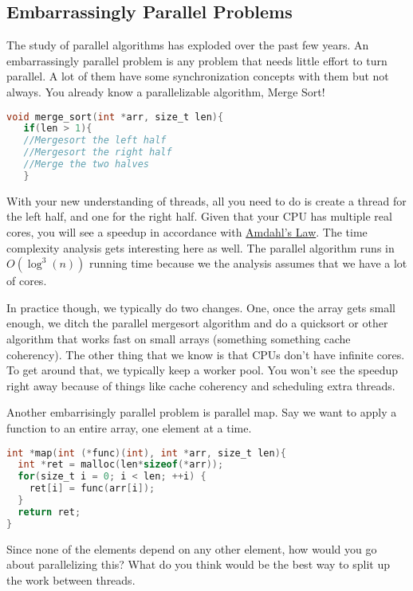 \subsection{Embarrassingly Parallel Problems}

The study of parallel algorithms has exploded over the past few years.
An embarrassingly parallel problem is any problem that needs little effort to turn parallel.
A lot of them have some synchronization concepts with them but not always.
You already know a parallelizable algorithm, Merge Sort!

\begin{lstlisting}[language=C]
void merge_sort(int *arr, size_t len){
   if(len > 1){
   //Mergesort the left half
   //Mergesort the right half
   //Merge the two halves
   }
\end{lstlisting}

With your new understanding of threads, all you need to do is create a thread for the left half, and one for the right half.
Given that your CPU has multiple real cores, you will see a speedup in accordance with \href{https://en.wikipedia.org/wiki/Amdahl's_law}{Amdahl's Law}.
The time complexity analysis gets interesting here as well.
The parallel algorithm runs in $O(\log^3(n))$ running time because we the analysis assumes that we have a lot of cores.

In practice though, we typically do two changes.
One, once the array gets small enough, we ditch the parallel mergesort algorithm and do a quicksort or other algorithm that works fast on small arrays (something something cache coherency).
The other thing that we know is that CPUs don't have infinite cores.
To get around that, we typically keep a worker pool.
You won't see the speedup right away because of things like cache coherency and scheduling extra threads.

Another embarrisingly parallel problem is parallel map.
Say we want to apply a function to an entire array, one element at a time.

\begin{lstlisting}[language=C]
int *map(int (*func)(int), int *arr, size_t len){
  int *ret = malloc(len*sizeof(*arr));
  for(size_t i = 0; i < len; ++i) {
    ret[i] = func(arr[i]);
  }
  return ret;
}
\end{lstlisting}

Since none of the elements depend on any other element, how would you go about parallelizing this?
What do you think would be the best way to split up the work between threads.

